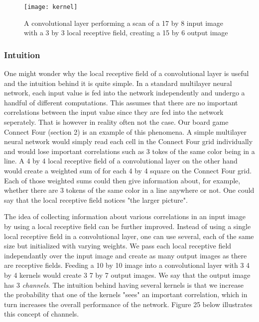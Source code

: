 \documentclass[titlepage]{article}
\begin{document}
\vskip 0.3cm

\begin{figure}[h]
    \center
    \texttt{[image: kernel]}
    \vskip 0.2cm
    \caption{A convolutional layer performing a scan of a 17 by 8 input image with a 3 by 3 local receptive field, creating a 15 by 6 output image}
\end{figure}

\newpage

\subsubsection{Intuition}

\vskip 0.2cm

One might wonder why the local receptive field of a convolutional layer is useful and the intuition behind it is quite simple. In a standard multilayer neural network, each input value is fed into the network independently and undergo a handful of different computations. This assumes that there are no important correlations between the input value since they are fed into the network seperately. That is however in reality often not the case. Our board game Connect Four (section 2) is an example of this phenomena. A simple multilayer neural network would simply read each cell in the Connect Four grid individually and would lose important correlations such as 3 tokes of the same color being in a line. A 4 by 4 local receptive field of a convolutional layer on the other hand would create a weighted sum of for each 4 by 4 square on the Connect Four grid. Each of those weighted sums could then give information about, for example, whether there are 3 tokens of the same color in a line anywhere or not. One could say that the local receptive field notices "the larger picture". 

\vskip 0.2cm

\noindent
The idea of collecting information about various correlations in an input image by using a local receptive field can be further improved. Instead of using a single local receptive field in a convolutional layer, one can use several, each of the same size but initialized with varying weights. We pass each local receptive field independantly over the input image and create as many output images as there are receptive fields. Feeding a 10 by 10 image into a convolutional layer with 3 4 by 4 kernels would create 3 7 by 7 output images. We say that the output image has 3 \emph{channels}. The intuition behind having several kernels is that we increase the probability that one of the kernels "sees" an important correlation, which in turn increases the overall performance of the network. Figure 25 below illustrates this concept of channels.
\end{document}
